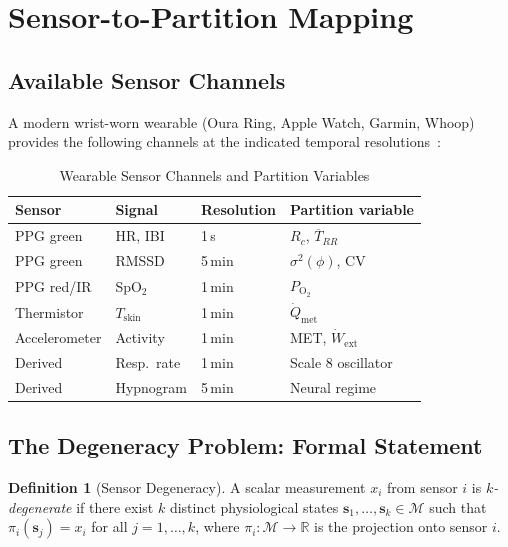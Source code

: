 \documentclass[10pt,twocolumn,a4paper]{article}
\theoremstyle{definition}
\newtheorem{definition}{Definition}
\newcommand{\Rc}{R_c}
\begin{document}
\section{Sensor-to-Partition Mapping}
\label{sec:sensor_model}

\subsection{Available Sensor Channels}

A modern wrist-worn wearable (Oura Ring, Apple Watch, Garmin, Whoop)
provides the following channels at the indicated temporal
resolutions~\cite{altini2021promise,derosario2019validity}:

\begin{table}[H]
\centering
\caption{Wearable Sensor Channels and Partition Variables}
\label{tab:sensors}
\begin{tabular}{llll}
\toprule
\textbf{Sensor} & \textbf{Signal} & \textbf{Resolution} & \textbf{Partition variable}\\
\midrule
PPG green & HR, IBI & 1\,s & $\Rc$, $\overline{T}_{RR}$\\
PPG green & RMSSD   & 5\,min & $\sigma^2(\phi)$, CV\\
PPG red/IR & SpO$_2$ & 1\,min & $P_{\text{O}_2}$\\
Thermistor & $T_{\text{skin}}$ & 1\,min & $\dot{Q}_{\text{met}}$\\
Accelerometer & Activity & 1\,min & MET, $\dot{W}_{\text{ext}}$\\
Derived & Resp.\ rate & 1\,min & Scale 8 oscillator\\
Derived & Hypnogram & 5\,min & Neural regime\\
\bottomrule
\end{tabular}
\end{table}

\subsection{The Degeneracy Problem: Formal Statement}

\begin{definition}[Sensor Degeneracy]
\label{def:degeneracy}
A scalar measurement $x_i$ from sensor $i$ is \emph{$k$-degenerate}
if there exist $k$ distinct physiological states
$\bm{s}_1, \ldots, \bm{s}_k \in \mathcal{M}$ such that
$\pi_i(\bm{s}_j) = x_i$ for all $j = 1, \ldots, k$, where
$\pi_i: \mathcal{M} \to \mathbb{R}$ is the projection onto sensor $i$.
\end{definition}
\end{document}
